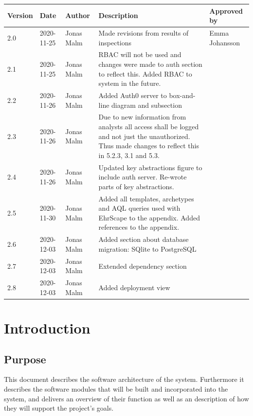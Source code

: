 \documentclass{article}
\begin{document}
\begin{table}
\centering
\begin{tabular}{|l|l|l|p{7cm}|p{3cm}|}
\hline
Version & Date & Author & Description & Approved by \\ \hline
2.0 & 2020-11-25 & Jonas Malm & Made revisions from results of inspections & Emma Johansson\\
2.1 & 2020-11-25 & Jonas Malm & RBAC will not be used and changes were made to auth section to reflect this. Added RBAC to system in the future. & \\
2.2 & 2020-11-26 & Jonas Malm & Added Auth0 server to box-and-line diagram and subsection & \\
2.3 & 2020-11-26 & Jonas Malm & Due to new information from analysts all access shall be logged and not just the unauthorized. Thus made changes to reflect this in 5.2.3, 3.1 and 5.3. & \\
2.4 & 2020-11-26 & Jonas Malm & Updated key abstractions figure to include auth server. Re-wrote parts of key abstractions. & \\
2.5 & 2020-11-30 & Jonas Malm & Added all templates, archetypes and AQL queries used with EhrScape to the appendix. Added references to the appendix. & \\
2.6 & 2020-12-03 & Jonas Malm & Added section about database migration: SQlite to PostgreSQL & \\
2.7 & 2020-12-03 & Jonas Malm & Extended dependency section & \\
2.8 & 2020-12-03 & Jonas Malm & Added deployment view & \\
\hline
\end{tabular}
\end{table}

\restoregeometry
\clearpage

\tableofcontents
\clearpage

\section{Introduction}
\subsection{Purpose}
This document describes the software architecture of the system. Furthermore it describes the software modules that will be built and incorporated into the system, and delivers an overview of their function as well as an description of how they will support the project's goals.
\end{document}
